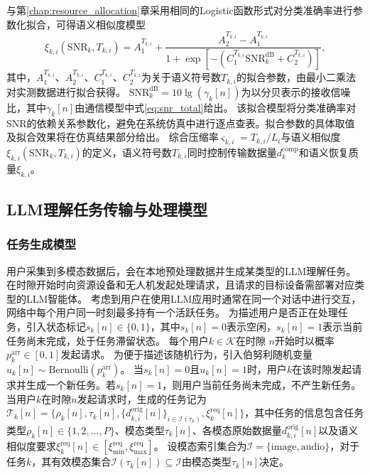 与第\ref{chap:resource_allocation}章采用相同的Logistic函数形式对分类准确率进行参数化拟合，可得语义相似度模型
\begin{equation}\label{eq:xi_fit}
\xi_{k,i}(\text{SNR}_k,T_{k,i}) = A_1^{T_{k,i}} + \frac{A_2^{T_{k,i}}-A_1^{T_{k,i}}}{1+\exp\!\left[-(C_1^{T_{k,i}}\text{SNR}_k^{\text{dB}} + C_2^{T_{k,i}})\right]},
\end{equation}
其中，$A_1^{T_{k,i}}$、$A_2^{T_{k,i}}$、$C_1^{T_{k,i}}$、$C_2^{T_{k,i}}$为关于语义符号数$T_{k,i}$的拟合参数，由最小二乘法对实测数据进行拟合获得。
$\text{SNR}_k^{\text{dB}}=10\lg(\gamma_k[n])$为以分贝表示的接收信噪比，其中$\gamma_k[n]$由通信模型中式\eqref{eq:snr_total}给出。
该拟合模型将分类准确率对SNR的依赖关系参数化，避免在系统仿真中进行逐点查表。拟合参数的具体取值及拟合效果将在仿真结果部分给出。
综合压缩率$\varsigma_{k,i} = T_{k,i}/L_i$与语义相似度$\xi_{k,i}(\text{SNR}_k, T_{k,i})$的定义，语义符号数$T_{k,i}$同时控制传输数据量$d_k^{\text{comp}}$和语义恢复质量$\xi_{k,i}$。


\subsection{LLM理解任务传输与处理模型}
\subsubsection{任务生成模型}
用户采集到多模态数据后，会在本地预处理数据并生成某类型的LLM理解任务。在时隙开始时向资源设备和无人机发起处理请求，且请求的目标设备需部署对应类型的LLM智能体。
考虑到用户在使用LLM应用时通常在同一个对话中进行交互，网络中每个用户同一时刻最多持有一个活跃任务。
为描述用户是否正在处理任务，引入状态标记$s_k[n]\in\{0,1\}$，其中$s_k[n]=0$表示空闲，$s_k[n]=1$表示当前任务尚未完成，处于任务滞留状态。
每个用户$k\in\mathcal{K}$在时隙 $n$开始时以概率$p_k^{\text{arr}}\in[0,1]$发起请求。
为便于描述该随机行为，引入伯努利随机变量 $u_k[n]\sim\mathrm{Bernoulli}(p_k^{\text{arr}})$。
当$s_k[n]=0$且$u_k[n]=1$时，用户$k$在该时隙发起请求并生成一个新任务。若$s_k[n]=1$，则用户当前任务尚未完成，不产生新任务。
当用户$k$在时隙$n$发起请求时，生成的任务记为 $\mathcal{T}_k[n]=\{\rho_k[n],\tau_k[n],\{d_{k,i}^{\text{orig}}[n]\}_{i\in\mathcal{I}(\tau_k)}, \xi_k^{\text{req}}[n]\}$，其中任务的信息包含任务类型$\rho_k[n]\in\{1,2,\ldots,P\}$、模态类型$\tau_k[n]$、各模态原始数据量$d_{k,i}^{\text{orig}}[n]$以及语义相似度要求$\xi_k^{\text{req}}[n]\in[\xi_{\min}^{\text{req}},\xi_{\max}^{\text{req}}]$。
设模态索引集合为$\mathcal{I}=\{\text{image},\text{audio}\}$，对于任务$k$，其有效模态集合$\mathcal{I}(\tau_k[n])\subseteq\mathcal{I}$由模态类型$\tau_k[n]$决定。

